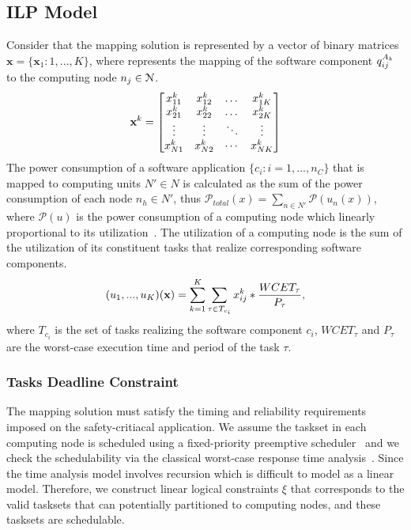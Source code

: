 \subsection*{ILP Model}
Consider that the mapping solution is represented by a vector of binary matrices $\textbf{x}=\{\textbf{x}_1:1,...,K\}$, where \ttxkij represents the mapping of the software component $\sss{q}[k][ij]$ to the computing node $\ssb{n}[j]\in \mathcal{N}$. 
\begin{equation}
\label{eqn_solution}
\bspx{k}=
\begin{bmatrix} 
\ssx{k}{11} & \ssx{k}{12} & \dots & \ssx{k}{1K}\\
\ssx{k}{21} & \ssx{k}{22} & \dots & \ssx{k}{2K}\\
\vdots & \vdots & \ddots & \vdots\\
\ssx{k}{N1} & \ssx{k}{N2} & \cdots & \ssx{k}{NK}
\end{bmatrix}
\end{equation}
The power consumption of a software application $\{c_i:i=1,...,n_C\}$ that is mapped to computing units $N'\in N$ is calculated as the sum of the power consumption of each node $n_h\in N'$, thus $\mathcal{P}_{total}(x)=\sum_{n\in N'}{\mathcal{P}(u_n(x))}$, where $\mathcal{P}(u)$ is the power consumption of a computing node which linearly proportional to its utilization~\cite{Mahmud5222}. The utilization of a computing node is the sum of the utilization of its constituent tasks that realize corresponding software components.
\begin{align}
	(u_1,...,u_K)(\textbf{x})=\sum_{k=1}^{K}\sum_{\tau\in T_{c_i}}{x^{k}_{ij}*\frac{WCET_\tau}{P_\tau}},
\end{align}
where $T_{c_i}$ is the set of tasks realizing the software component $c_i$, $WCET_\tau$ and $P_\tau$ are the worst-case execution time and  period of the task $\tau$.

\subsubsection{Tasks Deadline Constraint}
The mapping solution must satisfy the timing and reliability requirements imposed on the safety-critiacal application. We assume the taskset in each computing node is scheduled using a fixed-priority preemptive scheduler~\cite{Sha2004RealPerspective} and we check the schedulability via the classical worst-case response time analysis~\cite{Baruah2011Response-timeSystems}. Since the time analysis model involves recursion which is difficult to model as a linear model. Therefore, we construct linear logical constraints $\xi$ that corresponds to the valid tasksets that can potentially partitioned to computing nodes, and these tasksets are schedulable.


